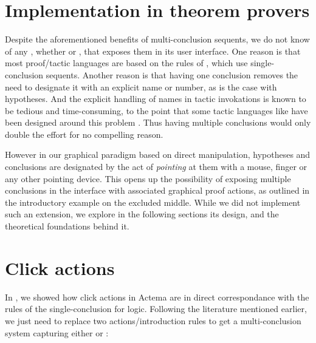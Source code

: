 \section{Implementation in theorem provers}

Despite the aforementioned benefits of multi-conclusion sequents, we do not know
of any , whether  or , that exposes them
in its user interface. One reason is that most proof/tactic languages are based
on the rules of , which use single-conclusion sequents. Another
reason is that having one conclusion removes the need to designate it with an
explicit name or number, as is the case with hypotheses. And the explicit handling
of names in tactic invokations is known to be tedious and time-consuming, to the
point that some tactic languages like \ssreflect have been designed around this
problem . Thus having multiple conclusions would only double the
effort for no compelling reason.

However in our graphical paradigm based on direct manipulation, hypotheses and
conclusions are designated by the act of \emph{pointing} at them with a mouse,
finger or any other pointing device. This opens up the possibility of exposing
multiple conclusions in the interface with associated graphical proof actions,
as outlined in the introductory example on the excluded middle. While we did not
implement such an extension, we explore in the following sections its design,
and the theoretical foundations behind it.

\section{Click actions}

In , we showed how click actions in Actema are in direct
correspondance with the rules of the single-conclusion  
for  logic. Following the literature mentioned earlier, we just
need to replace two actions/introduction rules to get a multi-conclusion system
capturing either  or  :


